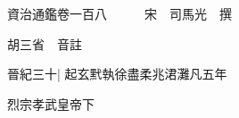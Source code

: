 






























































資治通鑑卷一百八　　　宋　司馬光　撰

胡三省　音註

晉紀三十|{
	起玄黓執徐盡柔兆涒灘凡五年}


烈宗孝武皇帝下

